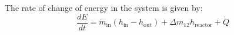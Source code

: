 The rate of change of energy in the system is given by:  
\[
\frac{dE}{dt} = \dot{m}_{\text{in}} \left( h_{\text{in}} - h_{\text{out}} \right) + \Delta m_{12} h_{\text{reactor}} + \dot{Q}
\]
